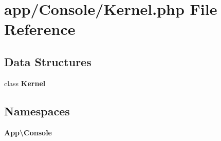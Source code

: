 \section{app/\+Console/\+Kernel.php File Reference}
\label{app_2_console_2_kernel_8php}
\subsection*{Data Structures}
\begin{DoxyCompactItemize}
\item 
class {\bf Kernel}
\end{DoxyCompactItemize}
\subsection*{Namespaces}
\begin{DoxyCompactItemize}
\item 
 {\bf App\textbackslash{}\+Console}
\end{DoxyCompactItemize}
